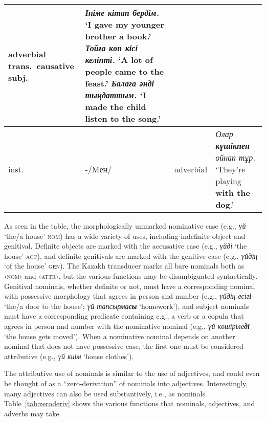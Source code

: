 \documentclass[a4paper,11pt, onecolumn,twoside]{article}
\newcommand{\gmk}[1]{{\rm {\ll \textsc{#1}}}}
\newcommand{\kazakh}[1]{{\em #1}}
\newcommand{\gloss}[1]{`#1'}
\newcommand{\tag}[1]{{\ll \textsc{‹#1›}}}
\begin{document}
\begin{table}[htbp]
\begin{small}
\begin{tabular}{l l p{9em} p{27.15em}}
										adverbial\newline
										trans.\ causative subj.%
									& \kazakh{\textbf{Ініме} кітап бердім.} \gloss{I gave \textbf{my younger brother} a book.} \newline
										\kazakh{\textbf{Тойға} көп кісі келіпті.} \gloss{A lot of people came \textbf{to the feast.}}\newline
										\kazakh{\textbf{Балаға} әнді тыңдаттым.} \gloss{I made \textbf{the child} listen to the song.}
										\\\midrule
				inst. & -/Mен/ &  adverbial & \kazakh{Олар \textbf{күшікпен} ойнап тұр.} \gloss{They're playing \textbf{with the dog}.} \\
			\bottomrule
		\end{tabular}
	\end{small}
\end{table}

As seen in the table, the morphologically unmarked nominative case (e.g., \kazakh{үй} \gloss{the/a house} \gmk{nom}) has a wide variety of uses, including indefinite object and genitival.  Definite objects are marked with the accusative case (e.g., \kazakh{үйді} \gloss{the house} \gmk{acc}), and definite genitivals are marked with the genitive case (e.g., \kazakh{үйдің} \gloss{of the house} \gmk{gen}).  The Kazakh transducer marks all bare nominals both as \tag{nom} and \tag{attr}, but the various functions may be disambiguated syntactically.  Genitival nominals, whether definite or not, must have a corresponding nominal with possessive morphology that agrees in person and number (e.g., \kazakh{үйдің есіг\textbf{і}} \gloss{the/a door to the house}; \kazakh{үй тапсырма\textbf{сы}} \gloss{homework}), and subject nominals must have a corresponding predicate containing e.g., a verb or a copula that agrees in person and number with the nominative nominal (e.g., \kazakh{үй көшіріле\textbf{ді}} \gloss{the house gets moved}).  When a nominative nominal depends on another nominal that does not have possessive case, the first one must be considered attributive (e.g., \kazakh{үй киім} \gloss{house clothes}).

The attributive use of nominals is similar to the use of adjectives, and could even be thought of as a ``zero-derivation'' of nominals into adjectives.  Interestingly, many adjectives can also be used substantively, i.e., as nominals.  Table~\ref{tab:zeroderiv} shows the various functions that nominals, adjectives, and adverbs may take.
\end{document}
